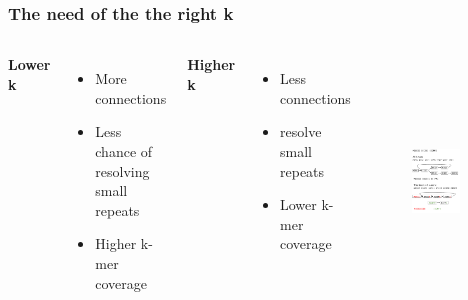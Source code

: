 \begin{frame}
\frametitle{The need of the the right k}
\begin{columns}
	
	\textbf{Lower k}
	\begin{itemize}
		\item More connections
		\item Less chance of resolving small repeats
		\item Higher k-mer coverage
    \end{itemize}
	\textbf{Higher k}
	\begin{itemize}
		\item Less connections
		\item resolve small repeats
		\item Lower k-mer coverage
	\end{itemize}
	\begin{figure}	
		\includegraphics[height=1\textwidth,width=0.8\textwidth]{img/merged-dbg.png}
	\end{figure}
\end{columns}
\end{frame}


